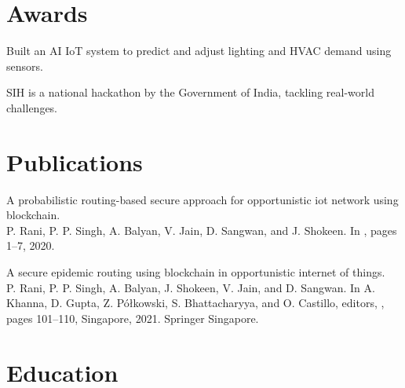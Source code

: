 \documentclass{fonts}
\begin{document}
\section{Awards} 
\textbf{}
\begin{tightemize}
    \item Built an AI IoT system to predict and adjust lighting and HVAC demand using sensors.
    \item SIH is a national hackathon by the Government of India, tackling real-world challenges.
\end{tightemize}
\sectionsep


\section{Publications}
\vspace{.5\baselineskip}
 \begin{tightemize} %
    \item A probabilistic routing-based secure approach for opportunistic iot network using blockchain. \\
    P. Rani, P. P. Singh, A. Balyan, V. Jain, D. Sangwan, and J. Shokeen. In , pages 1--7, 2020. %

    \item A secure epidemic routing using blockchain in opportunistic internet of things. \\
    P. Rani, P. P. Singh, A. Balyan, J. Shokeen, V. Jain, and D. Sangwan. In A. Khanna, D. Gupta, Z. Pó\l{}kowski, S. Bhattacharyya, and O. Castillo, editors, , pages 101--110, Singapore, 2021. Springer Singapore. %

 \end{tightemize}

 \sectionsep %







\section{Education} 


\sectionsep
{}
\end{document}
